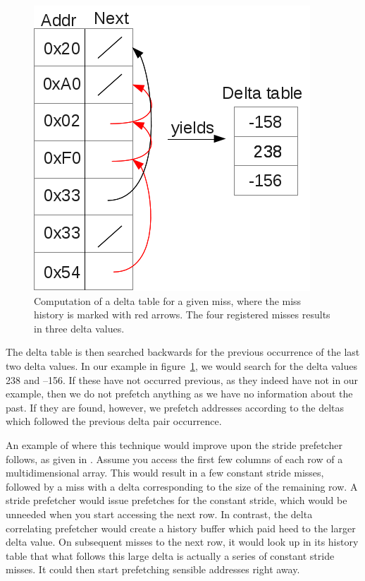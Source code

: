 \begin{figure}[ht]
  \centering
  \includegraphics[scale=0.5]{figures/delta_table_comp.png}
  \caption{\label{fig:deltaTableComp} Computation of a delta table for
    a given miss, where the miss history is marked with red
    arrows. The four registered misses results in three delta values.}
\end{figure}

The delta table is then searched backwards for the previous occurrence
of the last two delta values. In our example in
figure~\ref{fig:deltaTableComp}, we would search for the delta values
238 and --156. If these have not occurred previous, as they indeed
have not in our example, then we do not prefetch anything as we have
no information about the past. If they are found, however, we prefetch
addresses according to the deltas which followed the previous delta
pair occurrence. 

An example of where this technique would improve upon the stride
prefetcher follows, as given in \cite{Nesbit}. Assume you access the
first few columns of each row of a multidimensional array. This would
result in a few constant stride misses, followed by a miss with a
delta corresponding to the size of the remaining row. A stride
prefetcher would issue prefetches for the constant stride, which would
be unneeded when you start accessing the next row.
In contrast, the delta correlating prefetcher would create a history
buffer which paid heed to the larger delta value. On subsequent misses
to the next row, it would look up in its history table that what
follows this large delta is actually a series of constant stride
misses. It could then start prefetching sensible addresses right away.

